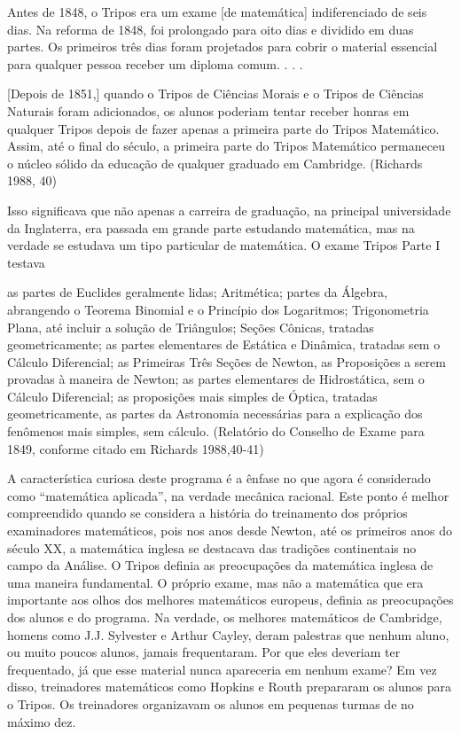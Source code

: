 \documentclass[12pt]{article}
\begin{document}
Antes de 1848, o Tripos era um exame [de matemática] indiferenciado de seis dias. Na reforma de 1848, foi prolongado para oito dias e dividido em duas partes. Os primeiros três dias foram projetados para cobrir o material essencial para qualquer pessoa receber um diploma comum. . . .

[Depois de 1851,] quando o Tripos de Ciências Morais e o Tripos de Ciências Naturais foram adicionados, os alunos poderiam tentar receber honras em qualquer Tripos depois de fazer apenas a primeira parte do Tripos Matemático. Assim, até o final do século, a primeira parte do Tripos Matemático permaneceu o núcleo sólido da educação de qualquer graduado em Cambridge. (Richards 1988, 40)

Isso significava que não apenas a carreira de graduação, na principal universidade da Inglaterra, era passada em grande parte estudando matemática, mas na verdade se estudava um tipo particular de matemática. O exame Tripos Parte I testava

as partes de Euclides geralmente lidas; Aritmética; partes da Álgebra, abrangendo o Teorema Binomial e o Princípio dos Logaritmos; Trigonometria Plana, até incluir a solução de Triângulos; Seções Cônicas, tratadas geometricamente; as partes elementares de Estática e Dinâmica, tratadas sem o Cálculo Diferencial; as Primeiras Três Seções de Newton, as Proposições a serem provadas à maneira de Newton; as partes elementares de Hidrostática, sem o Cálculo Diferencial; as proposições mais simples de Óptica, tratadas geometricamente, as partes da Astronomia necessárias para a explicação dos fenômenos mais simples, sem cálculo. (Relatório do Conselho de Exame para 1849, conforme citado em Richards 1988,40-41)

A característica curiosa deste programa é a ênfase no que agora é considerado como “matemática aplicada”, na verdade mecânica racional. Este ponto é melhor compreendido quando se considera a história do treinamento dos próprios examinadores matemáticos, pois nos anos desde Newton, até os primeiros anos do século XX, a matemática inglesa se destacava das tradições continentais no campo da Análise. O Tripos definia as preocupações da matemática inglesa de uma maneira fundamental. O próprio exame, mas não a matemática que era importante aos olhos dos melhores matemáticos europeus, definia as preocupações dos alunos e do programa. Na verdade, os melhores matemáticos de Cambridge, homens como J.J. Sylvester e Arthur Cayley, deram palestras que nenhum aluno, ou muito poucos alunos, jamais frequentaram. Por que eles deveriam ter frequentado, já que esse material nunca apareceria em nenhum exame? Em vez disso, treinadores matemáticos como Hopkins e Routh prepararam os alunos para o Tripos. Os treinadores organizavam os alunos em pequenas turmas de no máximo dez.
\end{document}

